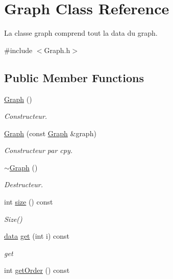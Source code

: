 \hypertarget{class_graph}{}\section{Graph Class Reference}
\label{class_graph}


La classe graph comprend tout la data du graph.  




{\ttfamily \#include $<$Graph.\+h$>$}

\subsection*{Public Member Functions}
\begin{DoxyCompactItemize}
\item 
\mbox{\hyperlink{class_graph_ae4c72b8ac4d693c49800a4c7e273654f}{Graph}} ()
\begin{DoxyCompactList}\small\item\em Constructeur. \end{DoxyCompactList}\item 
\mbox{\hyperlink{class_graph_af67de98565b93f81f3766649b567e662}{Graph}} (const \mbox{\hyperlink{class_graph}{Graph}} \&graph)
\begin{DoxyCompactList}\small\item\em Constructeur par cpy. \end{DoxyCompactList}\item 
\mbox{\hyperlink{class_graph_a902c5b3eacb66d60752525ab23297a95}{$\sim$\+Graph}} ()
\begin{DoxyCompactList}\small\item\em Destructeur. \end{DoxyCompactList}\item 
int \mbox{\hyperlink{class_graph_a6539d03f6d3f42042196f0f79455bdd8}{size}} () const
\begin{DoxyCompactList}\small\item\em Size() \end{DoxyCompactList}\item 
\mbox{\hyperlink{_graph_8h_a98cbe1f79429fc62806b32b6e8871d9e}{data}} \mbox{\hyperlink{class_graph_a78762961b8cf256a828c80cb7ec26021}{get}} (int i) const
\begin{DoxyCompactList}\small\item\em get \end{DoxyCompactList}\item 
int \mbox{\hyperlink{class_graph_a4edd61cf5268a3d467dafa9867376546}{get\+Order}} () const

\end{DoxyCompactItemize}
